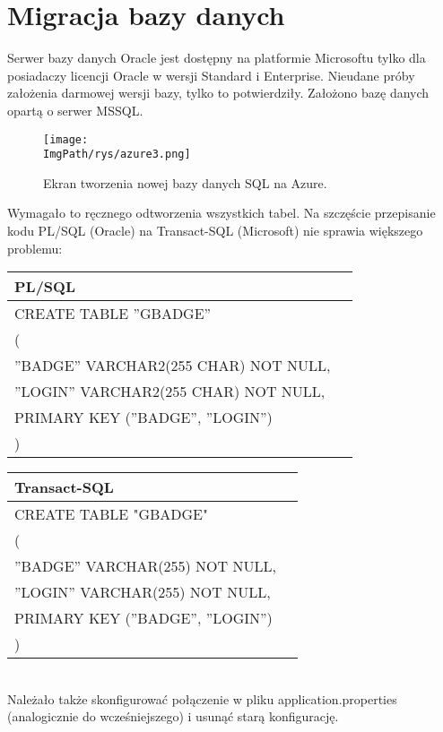 \documentclass[a4paper,12pt,twoside,openany]{report}
\newcommand{\ImgPath}{.}
\begin{document}
\section{Migracja bazy danych}
Serwer bazy danych Oracle jest dostępny na platformie Microsoftu tylko dla posiadaczy licencji Oracle w wersji Standard i Enterprise. Nieudane próby założenia darmowej wersji bazy, tylko to potwierdziły. Założono bazę danych opartą o serwer MSSQL.
				\begin{figure}[!htbp]
					\begin{center}
						\centering
						\texttt{[image: \\ImgPath/rys/azure3.png]}
					\end{center}
					\caption{Ekran tworzenia nowej bazy danych SQL na Azure.}
					\label{UMLTS}
				\end{figure}
Wymagało to ręcznego odtworzenia wszystkich tabel. Na szczęście przepisanie kodu PL/SQL (Oracle) na Transact-SQL (Microsoft) nie sprawia większego problemu:\\
\begin{tabular}{|p{7cm}|p{7cm}|}
	\hline PL/SQL\\ 
	\hline   CREATE TABLE ''GBADGE''  \\
	(\\	
	''BADGE'' VARCHAR2(255 CHAR) NOT NULL, \\
	''LOGIN'' VARCHAR2(255 CHAR) NOT NULL,  \\
	PRIMARY KEY (''BADGE'', ''LOGIN'')\\
	)\\
	\hline 
\end{tabular} 
\begin{tabular}{|p{7cm}|p{7cm}|}
	\hline Transact-SQL\\ 
	\hline CREATE TABLE "GBADGE" \\
	(\\
	''BADGE'' VARCHAR(255) NOT NULL, \\
	''LOGIN'' VARCHAR(255) NOT NULL, \\
	PRIMARY KEY (''BADGE'', ''LOGIN'')\\
	)\\
	\hline 
\end{tabular}\\
Należało także skonfigurować połączenie w pliku application.properties (analogicznie do wcześniejszego) i usunąć starą konfigurację.
\end{document}
